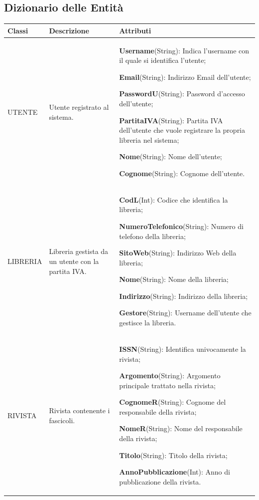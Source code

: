 \documentclass{article}
\begin{document}
\subsection{Dizionario delle Entità}
\begin{table}[h]
\centering
\begin{tabular}{|p{5cm}|p{3cm}|p{7cm}|}
    \hline
    \textbf{Classi} & \textbf{Descrizione} & \textbf{Attributi} \\\hline

    UTENTE & Utente registrato al sistema. & \textbf{Username}(String): Indica l'username con il quale si identifica l'utente; \par
    \textbf{Email}(String): Indirizzo Email dell'utente; \par 
    \textbf{PasswordU}(String): Password d'accesso dell'utente; \par
    \textbf{PartitaIVA}(String): Partita IVA dell'utente che vuole registrare la propria libreria nel sistema; \par 
    \textbf{Nome}(String): Nome dell'utente; \par 
    \textbf{Cognome}(String): Cognome dell'utente.\\\hline

    LIBRERIA & Libreria gestista da un utente con la partita IVA. & \textbf{CodL}(Int): Codice che identifica la libreria; \par
    \textbf{NumeroTelefonico}(String): Numero di telefono della libreria; \par
    \textbf{SitoWeb}(String): Indirizzo Web della libreria; \par
    \textbf{Nome}(String): Nome della libreria; \par
    \textbf{Indirizzo}(String): Indirizzo della libreria; \par
    \textbf{Gestore}(String): Username dell'utente che gestisce la libreria.\\\hline
    
    RIVISTA & Rivista contenente i fascicoli. & \textbf{ISSN}(String): Identifica univocamente la rivista; \par
    \textbf{Argomento}(String): Argomento principale trattato nella rivista; \par
    \textbf{CognomeR}(String): Cognome del responsabile della rivista; \par
    \textbf{NomeR}(String): Nome del responsabile della rivista; \par
    \textbf{Titolo}(String): Titolo della rivista; \par
    \textbf{AnnoPubblicazione}(Int): Anno di pubblicazione della rivista.\\\hline
\end{tabular}
\end{table}
\end{document}

